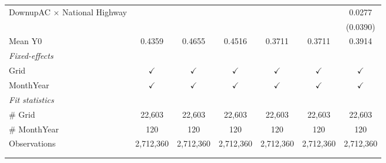 \begin{table}[htbp]
\begin{tabular}{lcccccc}
      DownupAC $\times$ National Highway                         &               &               &               &               &               & 0.0277\\   
                                                                 &               &               &               &               &               & (0.0390)\\   
      \hline Mean Y0                                             & 0.4359        & 0.4655        & 0.4516        & 0.3711        & 0.3711        & 0.3914\\  
      \midrule
      \emph{Fixed-effects}\\
      Grid                                                       & $\checkmark$  & $\checkmark$  & $\checkmark$  & $\checkmark$  & $\checkmark$  & $\checkmark$\\   
      MonthYear                                                  & $\checkmark$  & $\checkmark$  & $\checkmark$  & $\checkmark$  & $\checkmark$  & $\checkmark$\\   
      \midrule
      \emph{Fit statistics}\\
      \# Grid                                                    & 22,603        & 22,603        & 22,603        & 22,603        & 22,603        & 22,603\\  
      \# MonthYear                                               & 120           & 120           & 120           & 120           & 120           & 120\\  
      Observations                                               & 2,712,360     & 2,712,360     & 2,712,360     & 2,712,360     & 2,712,360     & 2,712,360\\  
      \midrule \midrule
                                                                 &               &               &               &               &               &  \tabularnewline 
      \\
   \end{tabular}
\end{table}



